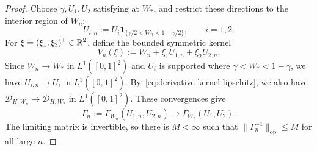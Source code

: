 \begin{proof}
Choose $\gamma,U_1,U_2$ satisfying 
at $W_*$, and restrict these directions to the interior region of $W_n$:
\[
  U_{i,n}:=U_i\mathbf1_{\{\gamma/2<W_n<1-\gamma/2\}},\qquad i=1,2.
\]
For $\xi=(\xi_1,\xi_2)^{\mathsf T}\in\mathbb R^2$, define the bounded symmetric kernel
\[
  V_n(\xi):=W_n+\xi_1U_{1,n}+\xi_2U_{2,n}.
\]
Since $W_n\to W_*$ in $L^1([0,1]^2)$ and $U_i$ is supported where
$\gamma<W_*<1-\gamma$, we have $U_{i,n}\to U_i$ in $L^1([0,1]^2)$.
By~\eqref{eq:derivative-kernel-lipschitz}, we also have
$\mathcal D_{H,W_n}\to\mathcal D_{H,W_*}$ in $L^1([0,1]^2)$.
These convergences give
\[
  \Gamma_n:=\Gamma_{W_n}(U_{1,n},U_{2,n})
  \longrightarrow\Gamma_{W_*}(U_1,U_2).
\]
The limiting matrix is invertible, so there is $M<\infty$ such that
$\|\Gamma_n^{-1}\|_{\mathrm{op}}\le M$ for all large $n$.


\end{proof}
